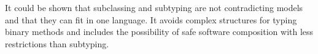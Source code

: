 It could be shown that subclassing and subtyping are not contradicting
models and that they can fit in one language. It avoids complex structures 
for typing binary methods and includes the possibility of safe software 
composition with less restrictions than subtyping.



%
